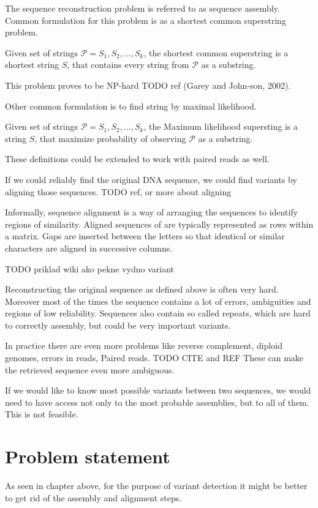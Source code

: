 The sequence reconstruction problem is referred to as sequence assembly. 
Common formulation for this problem is as a shortest common superstring problem.
\begin{definicia} 
Given set of strings $\mathcal{P} = {S_1 , S_2 , . . . , S_k }$,
the shortest common superstring is a shortest string $S$, that contains every string from $\mathcal{P}$ as a substring. 
\end{definicia}

This problem proves to be NP-hard TODO ref (Garey and John-son, 2002).

Other common formulation is to find string by maximal likelihood. 
\begin{definicia} 
Given set of strings $\mathcal{P} = {S_1 , S_2 , . . . , S_k }$,
the Maximum likelihood supersting is a string $S$, that maximize probability of observing $\mathcal{P}$ as a substring. 
\end{definicia}

These definitions could be extended to work with paired reads as well.

If we could reliably find the original DNA sequence, we could find variants by aligning those sequences.  TODO ref,  or more about aligning

Informally, sequence alignment is a way of arranging the sequences to identify regions of similarity. 
Aligned sequences of are typically represented as rows within a matrix. 
Gaps are inserted between the letters so that identical or similar characters are aligned in successive columns.

TODO priklad wiki  ako pekne vydno variant

Reconstructing the original sequence as defined above is often very hard.
Moreover most of the times the sequence contains a lot of errors, ambiguities and regions of low reliability. 
Sequences also contain so called repeats, which are hard to correctly assembly, but could be very important variants.

In practice there are even more problems like reverse complement, diploid genomes, errors in reads, Paired reads.
TODO CITE and REF
These can make the retrieved sequence even more ambiguous.

If we would like to know most possible variants between two sequences, we would need to have access not only to the most probable assemblies, but to all of them. This is not feasible.

\section{Problem statement}
As seen in chapter above, for the purpose of variant detection it might be better to get rid of the assembly and alignment steps. 


